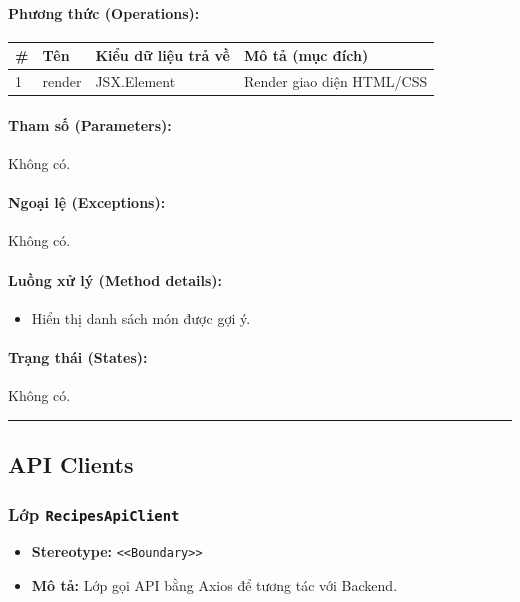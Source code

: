 \documentclass[12pt,a4paper]{article}
\begin{document}
\paragraph{Phương thức (Operations):}
\begin{longtable}{|p{0.6cm}|p{3.8cm}|p{2.6cm}|p{6.5cm}|}
\hline
\textbf{\#} & \textbf{Tên} & \textbf{Kiểu dữ liệu trả về} & \textbf{Mô tả (mục đích)} \\ \hline
\endhead
1 & render & JSX.Element & Render giao diện HTML/CSS \\ \hline
\end{longtable}

\paragraph{Tham số (Parameters):}
Không có.

\paragraph{Ngoại lệ (Exceptions):}
Không có.

\paragraph{Luồng xử lý (Method details):}
\begin{itemize}[leftmargin=*]
    \item Hiển thị danh sách món được gợi ý.
\end{itemize}


\paragraph{Trạng thái (States):}
Không có.

\vskip 0.5cm
\noindent\rule{\textwidth}{0.5pt}
\vskip 0.5cm

\subsection{API Clients}

\subsubsection{Lớp \texttt{RecipesApiClient}}
\begin{itemize}[leftmargin=*]
    \item \textbf{Stereotype:} \texttt{\textless{}\textless{}Boundary\textgreater{}\textgreater{}}
    \item \textbf{Mô tả:} Lớp gọi API bằng Axios để tương tác với Backend.
\end{itemize}
\end{document}
